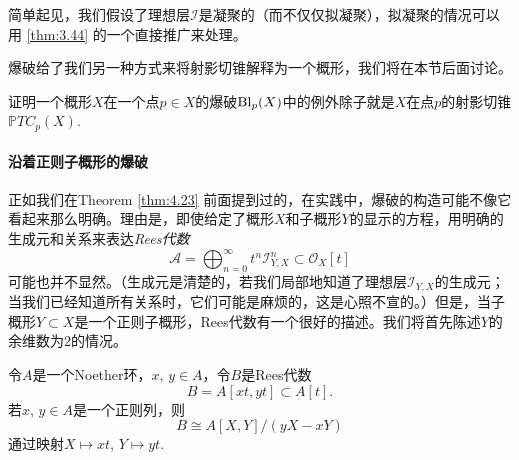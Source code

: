 简单起见，我们假设了理想层$\mathscr I$是凝聚的（而不仅仅拟凝聚），拟凝聚的情况可以用 \ref{thm:3.44} 的一个直接推广来处理。

爆破给了我们另一种方式来将射影切锥解释为一个概形，我们将在本节后面讨论。

\begin{exe}\label{exe:4.24}
	证明一个概形$X$在一个点$p\in X$的爆破$\operatorname{Bl}_p(X)$中的例外除子就是$X$在点$p$的射影切锥$\mathbb PTC_p(X)$.
\end{exe}

\paragraph*{沿着正则子概形的爆破} 正如我们在Theorem \ref{thm:4.23} 前面提到过的，在实践中，爆破的构造可能不像它看起来那么明确。理由是，即使给定了概形$X$和子概形$Y$的显示的方程，用明确的生成元和关系来表达\textit{Rees代数}
\[
	\mathscr A=\bigoplus_{n=0}^\infty t^n\mathscr I_{Y,X}^n\subset \mathscr O_X[t]
\]
可能也并不显然。（生成元是清楚的，若我们局部地知道了理想层$\mathscr I_{Y,X}$的生成元；当我们已经知道所有关系时，它们可能是麻烦的，这是心照不宣的。）但是，当子概形$Y\subset X$是一个正则子概形，Rees代数有一个很好的描述。我们将首先陈述$Y$的余维数为$2$的情况。


\begin{pro}\label{pro:4.25}
令$A$是一个Noether环，$x$, $y\in A$，令$B$是Rees代数
	\[
		B=A[xt,yt]\subset A[t].
	\]
若$x$, $y\in A$是一个正则列，则
	\[
		B\cong A[X,Y]/(yX-xY)
	\]
通过映射$X\mapsto xt$, $Y\mapsto yt$.
\end{pro}

